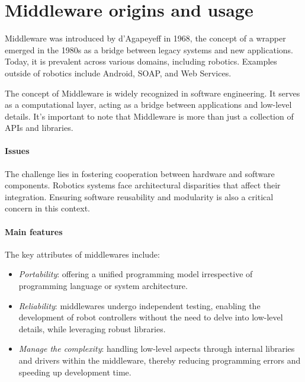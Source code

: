 \section{Middleware origins and usage}

Middleware was introduced by d'Agapeyeff in 1968, the concept of a wrapper emerged in the 1980s as a bridge between legacy systems and new applications. 
Today, it is prevalent across various domains, including robotics. 
Examples outside of robotics include Android, SOAP, and Web Services.

The concept of Middleware is widely recognized in software engineering. 
It serves as a computational layer, acting as a bridge between applications and low-level details. 
It's important to note that Middleware is more than just a collection of APIs and libraries.

\paragraph*{Issues}
The challenge lies in fostering cooperation between hardware and software components. 
Robotics systems face architectural disparities that affect their integration. 
Ensuring software reusability and modularity is also a critical concern in this context.

\paragraph*{Main features}
The key attributes of middlewares include:
\begin{itemize}
    \item \textit{Portability}: offering a unified programming model irrespective of programming language or system architecture.
    \item \textit{Reliability}: middlewares undergo independent testing, enabling the development of robot controllers without the need to delve into low-level details, while leveraging robust libraries.
    \item \textit{Manage the complexity}: handling low-level aspects through internal libraries and drivers within the middleware, thereby reducing programming errors and speeding up development time.
\end{itemize}

